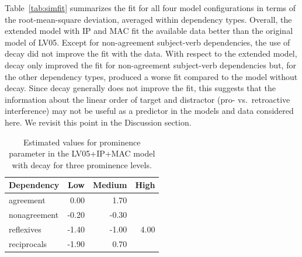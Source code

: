 \documentclass{cambridge7A}\usepackage[]{graphicx}\usepackage[]{color}
\begin{document}
Table~\ref{tab:simfit} summarizes the fit for all four model configurations in terms of the root-mean-square deviation, averaged within dependency types.
Overall, the extended model with IP and MAC fit the available data better than the original model of LV05. 
Except for non-agreement subject-verb dependencies, the use of decay did not improve the fit with the data. 
With respect to the extended model, decay only improved the fit for non-agreement subject-verb dependencies but, for the other dependency types, produced a worse fit compared to the model without decay. 
Since decay generally does not improve the fit, this suggests that the information about the linear order of target and distractor (pro- vs.\ retroactive interference) may not be useful as a predictor in the models and data considered here. 
We revisit this point in the Discussion section.



\begin{table}[ht]
\centering
\caption{Estimated values for prominence parameter in the LV05+IP+MAC model with decay for three prominence levels.} 
\label{tab:promtab}
\begin{tabular}{lrrr}
Dependency & Low & Medium & High \\ 
\hline
agreement & 0.00 & 1.70 &  \\ 
  nonagreement & -0.20 & -0.30 &  \\ 
  reflexives & -1.40 & -1.00 & 4.00 \\ 
  reciprocals & -1.90 & 0.70 &  \\ 
\end{tabular}
\end{table}
\end{document}
